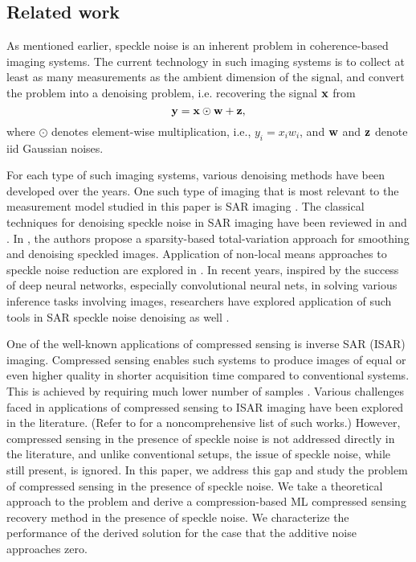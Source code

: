 \documentclass[onecolumn]{IEEEtran}
\newcommand{\wv}{{\bf w}}
\begin{document}


\subsection{Related work}

As mentioned earlier, speckle noise is an inherent problem  in coherence-based imaging systems. The current technology in such imaging systems is to collect at least as many measurements as  the ambient dimension of the signal, and convert the problem into a denoising problem, i.e. recovering the signal ${\bf x}$ from 
\[
\yv=\xv\odot \wv + \zv,
\]
where $\odot$ denotes element-wise multiplication, i.e., $y_i=x_iw_i$, and $\wv$ and ${\bf z}$ denote iid Gaussian noises.    

For each type of such imaging systems, various denoising methods have been developed over the years. One such type of imaging that is most relevant to the measurement model studied in this paper is SAR imaging \cite{moreira2013tutorial}.  The classical techniques for denoising speckle noise in SAR imaging have been reviewed in \cite{argenti2013tutorial} and \cite{touzi2002review}. In  \cite{ozcan2016despeckling}, the authors propose a sparsity-based  total-variation  approach for smoothing and denoising speckled images. Application of  non-local means approaches to speckle noise reduction are explored in \cite{deledalle2014patch,dimartino2016nonlocal}.  In recent years, inspired by the success of deep neural networks,  especially convolutional neural nets, in solving various inference tasks involving images, researchers have  explored application of such tools in SAR speckle noise denoising as well \cite{chierchial2017convolutional,wang2017convolutional}. 

One of the well-known applications of compressed sensing is  inverse SAR (ISAR) imaging. Compressed sensing enables such systems to produce images of equal or even higher quality in  shorter acquisition time compared to conventional systems. This is achieved by requiring much lower number of samples  \cite{yoon2008cs,patel2009cs}. Various challenges faced in  applications of compressed sensing to ISAR imaging have been explored in the literature. (Refer to  \cite{onhnon2010sparsity, demirci2013cs, cheng2018pareto, bi2017multifrequency,cetin2014sparsity} for a noncomprehensive list of  such works.) However,    compressed sensing in the presence of speckle noise is not addressed directly in the literature, and unlike  conventional setups, the issue of speckle noise, while still present, is ignored. In this paper, we address this gap and study the problem of compressed sensing in the presence of speckle noise. We  take a theoretical approach to the problem and derive a compression-based ML compressed sensing recovery method in the presence of speckle noise. We characterize the performance of the derived solution for the case that  the additive noise  approaches zero. 
\end{document}
